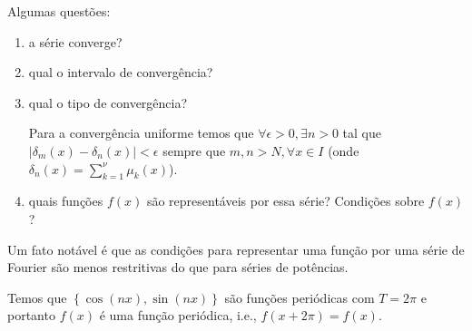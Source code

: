 Algumas questões:
\begin{enumerate}
  \item a série converge?
  \item qual o intervalo de convergência?
  \item qual o tipo de convergência?
    \begin{exem}
      Para a convergência uniforme temos que $\forall \epsilon > 0, \exists
      n > 0$ tal que $| \delta_m(x) - \delta_n(x)| < \epsilon$ sempre que $m, n
      > N, \forall x \in I$ (onde $\delta_n(x) = \sum_{k = 1}^\nu \mu_k(x)$).
    \end{exem}
  \item quais funções $f(x)$ são representáveis por essa série? Condições sobre
    $f(x)$?
\end{enumerate}

Um fato notável é que as condições para representar uma função por uma série de
Fourier são menos restritivas do que para séries de potências.

\begin{obs}
  Temos que $\left\{ \cos\left( n x \right), \sin\left( n x \right) \right\}$
  são funções periódicas com $T = 2\pi$ e portanto $f(x)$ é uma função
  periódica, i.e., $f(x + 2\pi) = f(x)$.
\end{obs}

